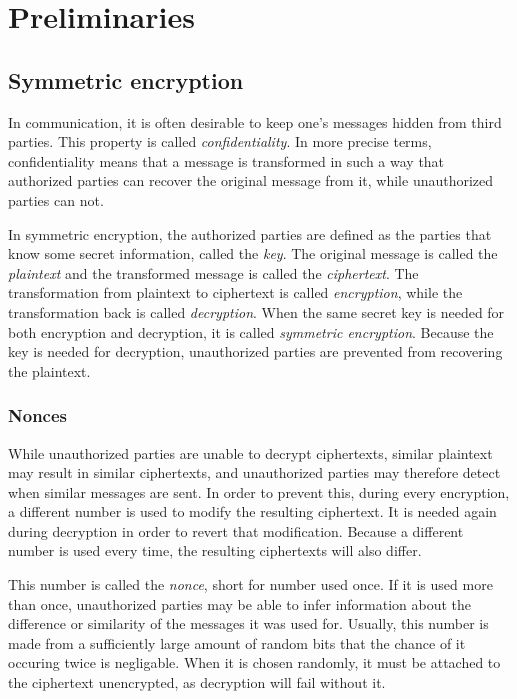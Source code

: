 \section{Preliminaries}

\subsection{Symmetric encryption}

In communication, it is often desirable to keep one's messages hidden from third
parties. This property is called \emph{confidentiality}. In more precise terms,
confidentiality means that a message is transformed in such a way that
authorized parties can recover the original message from it, while unauthorized
parties can not.

In symmetric encryption, the authorized parties are defined as
the parties that know some secret information, called the \emph{key}. The
original message is called the \emph{plaintext} and the transformed message is
called the \emph{ciphertext}. The transformation from plaintext to ciphertext is
called \emph{encryption}, while the transformation back is called
\emph{decryption}. When the same secret key is needed for both encryption and
decryption, it is called \emph{symmetric encryption}. Because the key is needed
for decryption, unauthorized parties are prevented from recovering the
plaintext.

\subsubsection{Nonces}

While unauthorized parties are unable to decrypt ciphertexts, similar plaintext
may result in similar ciphertexts, and unauthorized parties may therefore detect
when similar messages are sent. In order to prevent this, during every
encryption, a different number is used to modify the resulting ciphertext. It is
needed again during decryption in order to revert that modification. Because a
different number is used every time, the resulting ciphertexts will also differ.

This number is called the \emph{nonce}, short for number used once. If it is
used more than once, unauthorized parties may be able to infer information about
the difference or similarity of the messages it was used for. Usually, this
number is made from a sufficiently large amount of random bits that the chance
of it occuring twice is negligable. When it is chosen randomly, it must be
attached to the ciphertext unencrypted, as decryption will fail without it.


